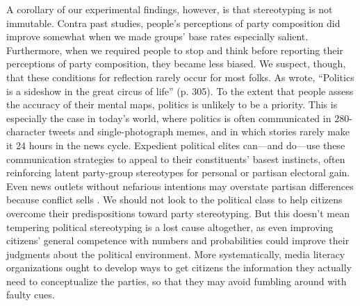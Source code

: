 \documentclass[12pt, letterpaper]{article}
\begin{document}
A corollary of our experimental findings, however, is that stereotyping is not immutable. Contra past studies, people's perceptions of party composition did improve somewhat when we made groups' base rates especially salient. Furthermore, when we required people to stop and think before reporting their perceptions of party composition, they became less biased. We suspect, though, that these conditions for reflection rarely occur for most folks. As \citet{Dahl1961} wrote, ``Politics is a sideshow in the great circus of life'' (p. 305). To the extent that people assess the accuracy of their mental maps, politics is unlikely to be a priority. This is especially the case in today's world, where politics is often communicated in 280-character tweets and single-photograph memes, and in which stories rarely make it 24 hours in the news cycle. Expedient political elites can---and do---use these communication strategies to appeal to their constituents' basest instincts, often reinforcing latent party-group stereotypes for personal or partisan electoral gain. %
Even news outlets without nefarious intentions may overstate partisan differences because conflict sells \citep{FiorinaAbramsPope2005,levendusky2016media}. We should not look to the political class to help citizens overcome their predispositions toward party stereotyping. But this doesn't mean tempering political stereotyping is a lost cause altogether, as even improving citizens' general competence with numbers and probabilities could improve their judgments about the political environment. More systematically, media literacy organizations ought to develop ways to get citizens the information they actually need to conceptualize the parties, so that they may avoid fumbling around with faulty cues. 
\end{document}
